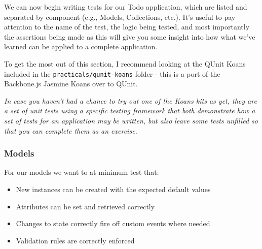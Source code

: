 \documentclass[9pt]{book}
\begin{document}
We can now begin writing tests for our Todo application, which are
listed and separated by component (e.g., Models, Collections, etc.).
It's useful to pay attention to the name of the test, the logic being
tested, and most importantly the assertions being made as this will give
you some insight into how what we've learned can be applied to a
complete application.

To get the most out of this section, I recommend looking at the QUnit
Koans included in the \texttt{practicals/qunit-koans} folder - this is a
port of the Backbone.js Jasmine Koans over to QUnit.

\emph{In case you haven't had a chance to try out one of the Koans kits
as yet, they are a set of unit tests using a specific testing framework
that both demonstrate how a set of tests for an application may be
written, but also leave some tests unfilled so that you can complete
them as an exercise.}

\subsubsection{Models}\label{models-3}

For our models we want to at minimum test that:

\begin{itemize}
\itemsep1pt\parskip0pt
\item
  New instances can be created with the expected default values
\item
  Attributes can be set and retrieved correctly
\item
  Changes to state correctly fire off custom events where needed
\item
  Validation rules are correctly enforced
\end{itemize}
\end{document}

